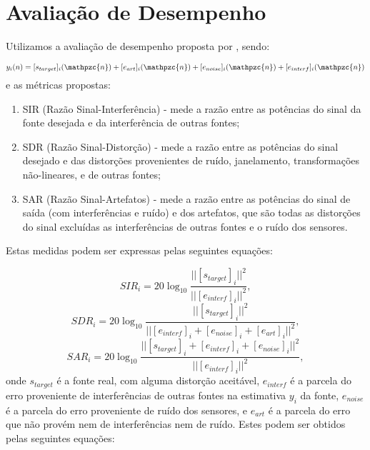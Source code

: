 \section{Avaliação de Desempenho}\label{metrics}
    Utilizamos a avaliação de desempenho proposta por \cite{performance}, sendo:
    
    \begin{equation}
         y_i(n) = [s_{target}]_i(\mathpzc{n})  + [e_{art}]_i(\mathpzc{n})  +  [e_{noise}]_i(\mathpzc{n}) +  [e_{interf}]_i(\mathpzc{n})
    \end{equation}
    e as métricas propostas:
    
    \begin{enumerate}
        \item SIR (Razão Sinal-Interferência) - mede a razão entre as potências do sinal da fonte desejada e da interferência de outras fontes;
        \item SDR (Razão Sinal-Distorção) - mede a razão entre as potências do sinal desejado e das distorções provenientes de ruído, janelamento, transformações não-lineares, e de outras fontes;
        \item SAR (Razão Sinal-Artefatos) - mede a razão entre as potências do sinal de saída (com interferências e ruído) e dos artefatos, que são todas as distorções do sinal excluídas as interferências de outras fontes e o ruído dos sensores.
    \end{enumerate}
    
    Estas medidas podem ser expressas pelas seguintes equações:
    
    \begin{equation}
        \label{eq:sir}
        SIR_i = 20\log_{10} \frac{|| [s_{target}]_i ||^2}{|| [e_{interf}]_i ||^2},
    \end{equation}
    \medskip
    \begin{equation}
        \label{eq:sdr}
        SDR_i = 20\log_{10} \frac{|| [s_{target}]_i ||^2}{|| [e_{interf}]_i + [e_{noise}]_i + [e_{art}]_i   ||^2},
    \end{equation}
    \medskip
    \begin{equation}
        \label{eq:sar}
        SAR_i = 20\log_{10} \frac{|| [s_{target}]_i + [e_{interf}]_i + [e_{noise}]_i ||^2}{|| [e_{interf}]_i ||^2},
    \end{equation}
    onde $s_{target}$ é a fonte real, com alguma distorção aceitável, $e_{interf}$  é a parcela do erro proveniente de interferências de outras fontes na estimativa $y_i$ da fonte, $e_{noise}$ é a parcela do erro proveniente de ruído dos sensores, e $e_{art}$ é a parcela do erro que não provém nem de interferências nem de ruído. Estes podem ser obtidos pelas seguintes equações:

